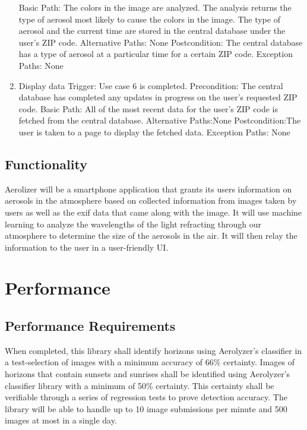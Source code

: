 \documentclass[journal,10pt,draftclsnofoot,onecolumn]{IEEEtran}
\begin{document}
\begin{singlespace}
\begin{enumerate}
Basic Path:
The colors in the image are analyzed.
The analysis returns the type of aerosol most likely to cause the colors in the image.
The type of aerosol and the current time are stored in the central database under the user's ZIP code.
Alternative Paths: None
Postcondition: The central database has a type of aerosol at a particular time for a certain ZIP code.
Exception Paths: None
\\
\item Display data
Trigger: Use case 6 is completed.
Precondition: The central database has completed any updates in progress on the user's requested ZIP code.
Basic Path: 
All of the most recent data for the user's ZIP code is fetched from the central database.
Alternative Paths:None
Postcondition:The user is taken to a page to display the fetched data.
Exception Paths: None
\end{enumerate}

\subsection{Functionality}
Aerolizer will be a smartphone application that grants its users information on aerosols in the atmosphere based on collected information from images taken by users as well as the exif data that came along with the image. It will use machine learning to analyze the wavelengths of the light refracting through our atmosphere to determine the size of the aerosols in the air. It will then relay the information to the user in a user-friendly UI. 

\section{Performance}
\subsection{Performance Requirements}
When completed, this library shall identify horizons using Aerolyzer's classifier in a test-selection of images with a minimum accuracy of 66\% certainty. Images of horizons that contain sunsets and sunrises shall be identified using Aerolyzer's classifier library with a minimum of 50\% certainty. This certainty shall be verifiable through a series of regression tests to prove detection accuracy.
The library will be able to handle up to 10 image submissions per minute and 500 images at most in a single day.


\nocite{*}




\end{singlespace}
\end{document}
